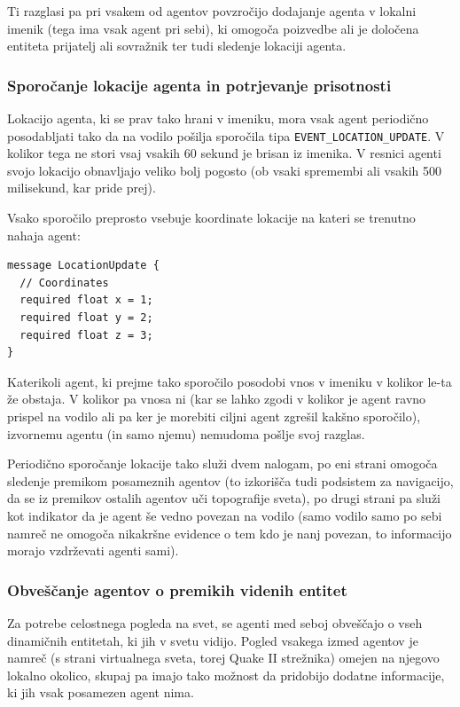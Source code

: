 \documentclass[a4paper,10pt]{article}
\begin{document}
Ti razglasi pa pri vsakem od agentov povzročijo dodajanje agenta v lokalni imenik (tega ima vsak agent pri sebi), ki omogoča poizvedbe ali je določena entiteta prijatelj ali sovražnik ter tudi sledenje lokaciji agenta.

\subsubsection{Sporočanje lokacije agenta in potrjevanje prisotnosti}

Lokacijo agenta, ki se prav tako hrani v imeniku, mora vsak agent periodično posodabljati tako da na vodilo pošilja sporočila tipa \texttt{EVENT\_LOCATION\_UPDATE}. V kolikor tega ne stori vsaj vsakih 60 sekund je brisan iz imenika. V resnici agenti svojo lokacijo obnavljajo veliko bolj pogosto (ob vsaki spremembi ali vsakih 500 milisekund, kar pride prej).

Vsako sporočilo preprosto vsebuje koordinate lokacije na kateri se trenutno nahaja agent:
\begin{verbatim}
message LocationUpdate {
  // Coordinates
  required float x = 1;
  required float y = 2;
  required float z = 3;
}
\end{verbatim}

\noindent
Katerikoli agent, ki prejme tako sporočilo posodobi vnos v imeniku v kolikor le-ta že obstaja. V kolikor pa vnosa ni (kar se lahko zgodi v kolikor je agent ravno prispel na vodilo ali pa ker je morebiti ciljni agent zgrešil kakšno sporočilo), izvornemu agentu (in samo njemu) nemudoma pošlje svoj razglas.

Periodično sporočanje lokacije tako služi dvem nalogam, po eni strani omogoča sledenje premikom posameznih agentov (to izkorišča tudi podsistem za navigacijo, da se iz premikov ostalih agentov uči topografije sveta), po drugi strani pa služi kot indikator da je agent še vedno povezan na vodilo (samo vodilo samo po sebi namreč ne omogoča nikakršne evidence o tem kdo je nanj povezan, to informacijo morajo vzdrževati agenti sami).

\subsubsection{Obveščanje agentov o premikih videnih entitet}

Za potrebe celostnega pogleda na svet, se agenti med seboj obveščajo o vseh dinamičnih entitetah, ki jih v svetu vidijo. Pogled vsakega izmed agentov je namreč (s strani virtualnega sveta, torej Quake II strežnika) omejen na njegovo lokalno okolico, skupaj pa imajo tako možnost da pridobijo dodatne informacije, ki jih vsak posamezen agent nima.
\end{document}
